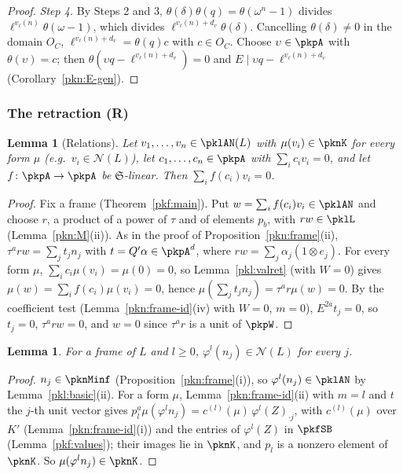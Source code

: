 \documentclass[10pt]{amsart}
\newtheorem{lemma}[theorem]{Lemma}
\theoremstyle{definition}
\theoremstyle{remark}
\begin{document}
\begin{proof}
\emph{Step 4.} By Steps 2 and 3, $\theta(\delta)\theta(q)=\theta(\omega^n-1)$ divides $\ell^{v_\ell(n)}\theta(\omega-1)$,
which divides $\ell^{v_\ell(n)+d_v}\theta(\delta)$. Cancelling $\theta(\delta)\ne0$ in the domain $O_C$,
$\ell^{v_\ell(n)+d_v}=\theta(q)c$ with $c\in O_C$. Choose $\upsilon\in\pkpA$ with $\theta(\upsilon)=c$; then
$\theta(\upsilon q-\ell^{v_\ell(n)+d_v})=0$ and $E\mid\upsilon q-\ell^{v_\ell(n)+d_v}$ (Corollary~\ref{pkn:E-gen}).
\end{proof}

\subsubsection{The retraction (R)}\label{pkl:ss-R}

\begin{lemma}[Relations]\label{pkl:rel}
Let $v_1,\dots,v_n\in\pklAN(L)$ with $\mu(v_i)\in\pknK$ for every form $\mu$ (e.g.\ $v_i\in\mathcal N(L)$), let
$c_1,\dots,c_n\in\pkpA$ with $\sum_ic_iv_i=0$, and let $f\colon\pkpA\to\pkpA$ be $\mathfrak S$-linear. Then
$\sum_if(c_i)v_i=0$.
\end{lemma}

\begin{proof}
Fix a frame (Theorem~\ref{pkf:main}). Put $w=\sum_if(c_i)v_i\in\pklAN$ and choose $r$, a product of a power of
$\tau$ and of elements $p_b$, with $rw\in\pklL$ (Lemma~\ref{pkn:M}(ii)). As in the proof of
Proposition~\ref{pkn:frame}(ii), $\tau^arw=\sum_jt_jn_j$ with $t=Q'\alpha\in\pkpA^d$, where $rw=\sum_j\alpha_j
(1\otimes e_j)$. For every form $\mu$, $\sum_ic_i\mu(v_i)=\mu(0)=0$, so Lemma~\ref{pkl:valret} (with $W=0$) gives
$\mu(w)=\sum_if(c_i)\mu(v_i)=0$, hence $\mu(\sum_jt_jn_j)=\tau^ar\mu(w)=0$. By the coefficient test
(Lemma~\ref{pkn:frame-id}(iv) with $W=0$, $m=0$), $E^{2a}t_j=0$, so $t_j=0$, $\tau^arw=0$, and $w=0$ since
$\tau^ar$ is a unit of $\pkpW$.
\end{proof}

\begin{lemma}\label{pkl:phin}
For a frame of $L$ and $l\ge0$, $\varphi^l(n_j)\in\mathcal N(L)$ for every $j$.
\end{lemma}

\begin{proof}
$n_j\in\pknMinf$ (Proposition~\ref{pkn:frame}(i)), so $\varphi^l(n_j)\in\pklAN$ by Lemma~\ref{pkl:basic}(ii). For a form
$\mu$, Lemma~\ref{pkn:frame-id}(ii) with $m=l$ and $t$ the $j$-th unit vector gives $p_l^a\mu(\varphi^ln_j)=
c^{(l)}(\mu)\,\varphi^l(Z)_{\cdot j}$, with $c^{(l)}(\mu)$ over $K'$ (Lemma~\ref{pkn:frame-id}(i)) and the entries of
$\varphi^l(Z)$ in $\pkfSB$ (Lemma~\ref{pkf:values}); their images lie in $\pknK$, and $p_l$ is a nonzero element of
$\pknK$. So $\mu(\varphi^ln_j)\in\pknK$.
\end{proof}
\end{document}
